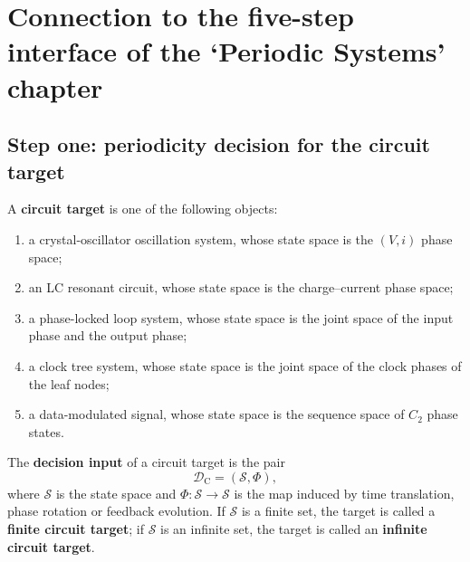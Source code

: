 \section{Connection to the five-step interface of the `Periodic Systems' chapter}
\label{sec:circuit_five_steps}

\subsection{Step one: periodicity decision for the circuit target}

\begin{definition}\label{def:circuit_target}
A \textbf{circuit target} is one of the following objects:
\begin{enumerate}[label=(\roman*)]
    \item a crystal-oscillator oscillation system, whose state space is the $(V,i)$ phase space;
    \item an LC resonant circuit, whose state space is the charge--current phase space;
    \item a phase-locked loop system, whose state space is the joint space of the input phase and the output phase;
    \item a clock tree system, whose state space is the joint space of the clock phases of the leaf nodes;
    \item a data-modulated signal, whose state space is the sequence space of $C_2$ phase states.
\end{enumerate}
The \textbf{decision input} of a circuit target is the pair
\[
\mathcal D_{\mathrm{C}}=(\mathcal S,\Phi),
\]
where $\mathcal S$ is the state space and $\Phi:\mathcal S\to\mathcal S$ is the map induced by time translation, phase rotation or feedback evolution. If $\mathcal S$ is a finite set, the target is called a \textbf{finite circuit target}; if $\mathcal S$ is an infinite set, the target is called an \textbf{infinite circuit target}.
\end{definition}

